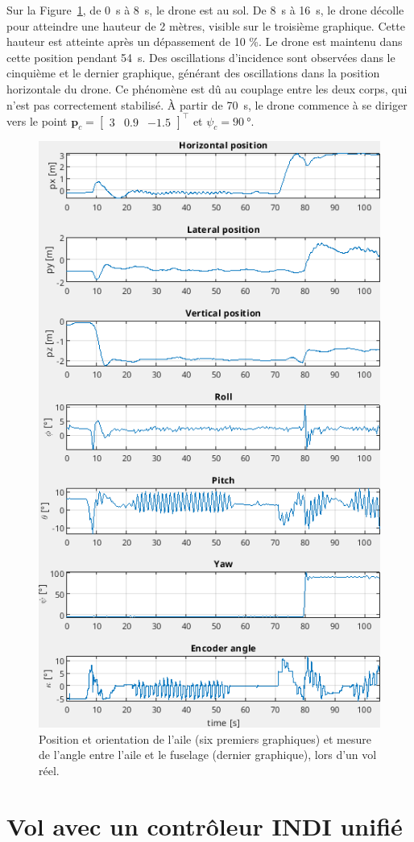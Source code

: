 Sur la Figure~\ref{fig:colibri_flight}, de \SI{0}{\second} à \SI{8}{\second}, le drone est au sol. De \SI{8}{\second} à \SI{16}{\second}, le drone décolle pour atteindre une hauteur de 2 mètres, visible sur le troisième graphique. Cette hauteur est atteinte après un dépassement de 10 \%. Le drone est maintenu dans cette position pendant \SI{54}{\second}. Des oscillations d'incidence sont observées dans le cinquième et le dernier graphique, générant des oscillations dans la position horizontale du drone. Ce phénomène est dû au couplage entre les deux corps, qui n'est pas correctement stabilisé. À partir de \SI{70}{\second}, le drone commence à se diriger vers le point $\boldsymbol{p}_{c} = \begin{bmatrix} 3 & 0.9 & -1.5 \end{bmatrix}^\top$ et $\psi_{c}=\SI{90}{\degree}$.
\begin{figure}[ht!]
\centering
    \includegraphics[width=0.6\columnwidth,angle=0]{figures/colibri_flight.png}
    \caption{Position et orientation de l'aile (six premiers graphiques) et mesure de l'angle entre l'aile et le fuselage (dernier graphique), lors d'un vol réel. }
    \label{fig:colibri_flight}
\end{figure}


\section{Vol avec un contrôleur INDI unifié}

